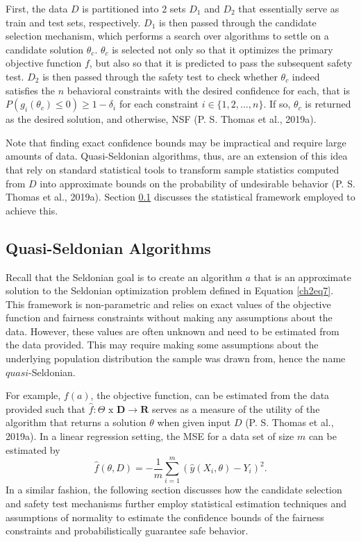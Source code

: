 \documentclass[12pt, twoside]{amherstthesis}
\begin{document}
First, the data \(D\) is partitioned into 2 sets \(D_1\) and \(D_2\) that essentially serve as train and test sets, respectively. \(D_1\) is then passed through the candidate selection mechanism, which performs a search over algorithms to settle on a candidate solution \(\theta_c\). \(\theta_c\) is selected not only so that it optimizes the primary objective function \(f\), but also so that it is predicted to pass the subsequent safety test. \(D_2\) is then passed through the safety test to check whether \(\theta_c\) indeed satisfies the \(n\) behavioral constraints with the desired confidence for each, that is \(P(g_i(\theta_c) \leq 0) \geq 1 - \delta_i\) for each constraint \(i \in \{ 1,2, \ldots, n \}\). If so, \(\theta_c\) is returned as the desired solution, and otherwise, NSF (P. S. Thomas et al., 2019a).

Note that finding exact confidence bounds may be impractical and require large amounts of data. Quasi-Seldonian algorithms, thus, are an extension of this idea that rely on standard statistical tools to transform sample statistics computed from \(D\) into approximate bounds on the probability of undesirable behavior (P. S. Thomas et al., 2019a). Section \ref{qsa} discusses the statistical framework employed to achieve this.

\hypertarget{qsa}{%
\subsection{Quasi-Seldonian Algorithms}\label{qsa}}

Recall that the Seldonian goal is to create an algorithm \(a\) that is an approximate solution to the Seldonian optimization problem defined in Equation \ref{ch2eq7}. This framework is non-parametric and relies on exact values of the objective function and fairness constraints without making any assumptions about the data. However, these values are often unknown and need to be estimated from the data provided. This may require making some assumptions about the underlying population distribution the sample was drawn from, hence the name \(\textit{quasi}\)-Seldonian.

For example, \(f(a)\), the objective function, can be estimated from the data provided such that \(\hat{f}: \Theta \text{ x } \textbf{D} \rightarrow \textbf{R}\) serves as a measure of the utility of the algorithm that returns a solution \(\theta\) when given input \(D\) (P. S. Thomas et al., 2019a). In a linear regression setting, the MSE for a data set of size \(m\) can be estimated by
\begin{equation}
\label{ch2eq9}
\hat{f}(\theta, D) = -\frac{1}{m} \sum_{i=1}^{m}(\hat{y}(X_i, \theta) - Y_i)^2.
\end{equation}
In a similar fashion, the following section discusses how the candidate selection and safety test mechanisms further employ statistical estimation techniques and assumptions of normality to estimate the confidence bounds of the fairness constraints and probabilistically guarantee safe behavior.
\end{document}
